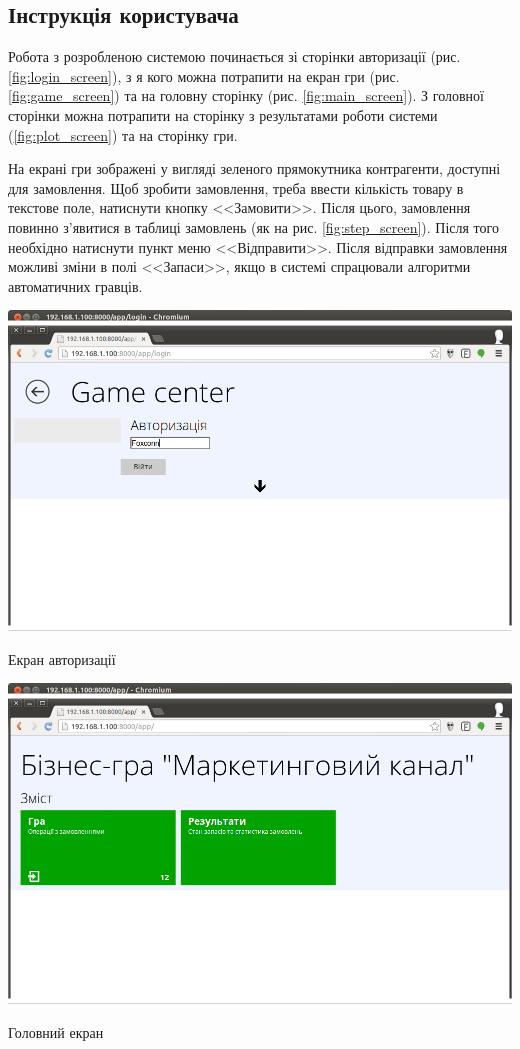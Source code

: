 \subsection{Інструкція користувача}
Робота з розробленою системою починається зі сторінки авторизації (рис. \ref{fig:login_screen}), з я кого можна потрапити на екран гри (рис. \ref{fig:game_screen}) та на головну сторінку (рис. \ref{fig:main_screen}). З головної сторінки можна потрапити на сторінку з результатами роботи системи (\ref{fig:plot_screen}) та на сторінку гри. 

На екрані гри зображені у вигляді зеленого прямокутника контрагенти, доступні для замовлення. Щоб зробити замовлення, треба ввести кількість товару в текстове поле, натиснути кнопку <<Замовити>>. Після цього, замовлення повинно з’явитися в таблиці замовлень (як на рис. \ref{fig:step_screen}). Після того необхідно натиснути пункт меню <<Відправити>>. Після відправки замовлення можливі зміни в полі <<Запаси>>, якщо в системі спрацювали алгоритми автоматичних гравців.
\begin{stdfigure}
    \includegraphics[width=7in]{images/screen/login_screen.png}
    \caption{Екран авторизації}
    \label{fig:login_screen}
\end{stdfigure}   
\begin{stdfigure}
    \includegraphics[width=7in]{images/screen/main_screen.png}
    \caption{Головний екран}
    \label{fig:main_screen}
\end{stdfigure}

